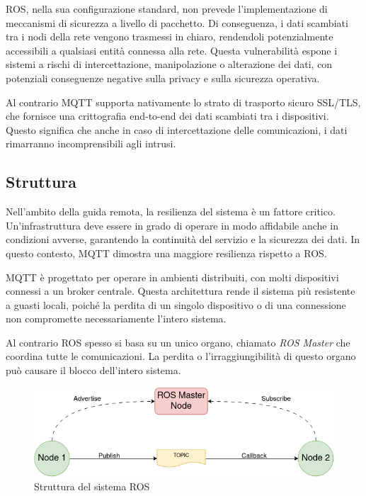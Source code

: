 \noindent ROS, nella sua configurazione standard, non prevede l'implementazione di meccanismi di sicurezza a livello di pacchetto. Di conseguenza, i dati scambiati tra i nodi della rete vengono trasmessi in chiaro, rendendoli potenzialmente accessibili a qualsiasi entità connessa alla rete. Questa vulnerabilità espone i sistemi a rischi di intercettazione, manipolazione o alterazione dei dati, con potenziali conseguenze negative sulla privacy e sulla sicurezza operativa.

\noindent Al contrario MQTT supporta nativamente lo strato di trasporto sicuro SSL/TLS, che fornisce una crittografia end-to-end dei dati scambiati tra i dispositivi. Questo significa che anche in caso di intercettazione delle comunicazioni, i dati rimarranno incomprensibili agli intrusi.

\subsection{Struttura}
Nell'ambito della guida remota, la resilienza del sistema è un fattore critico. Un'infrastruttura deve essere in grado di operare in modo affidabile anche in condizioni avverse, garantendo la continuità del servizio e la sicurezza dei dati. In questo contesto, MQTT dimostra una maggiore resilienza rispetto a ROS. 

\noindent MQTT è progettato per operare in ambienti distribuiti, con molti dispositivi connessi a un broker centrale. Questa architettura rende il sistema più resistente a guasti locali, poiché la perdita di un singolo dispositivo o di una connessione non compromette necessariamente l'intero sistema.

\noindent Al contrario ROS spesso si basa su un unico organo, chiamato \textit{ROS Master} che coordina tutte le comunicazioni. La perdita o l'irraggiungibilità di questo organo può causare il blocco dell'intero sistema.

\begin{figure}[H]
  \centering
  \includegraphics[width=1\textwidth]{figures/ros_master.png}
  \caption{Struttura del sistema ROS}
  \label{struttura_ros}
\end{figure}

